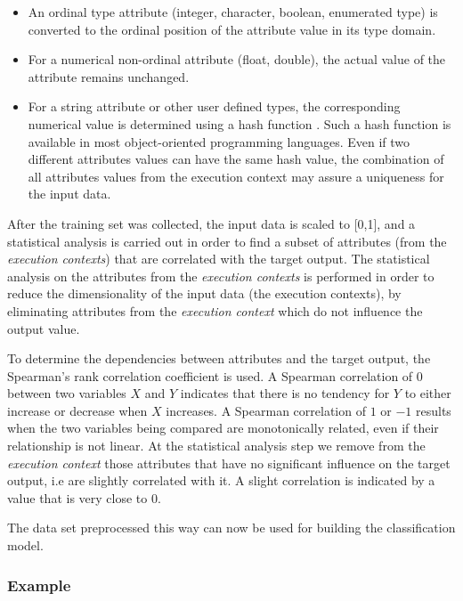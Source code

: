 \begin{itemize}

\item An ordinal type attribute (integer, character, boolean, enumerated type) is converted to the ordinal position of the attribute value in its type domain.

\item For a numerical non-ordinal attribute (float, double), the actual value of the attribute remains unchanged.

\item For a string attribute or other user defined types, the corresponding numerical value is determined using a hash function \cite{Cormen09Introduction}. Such a hash function is available in most object-oriented programming languages. Even if two different attributes values can have the same hash value, the combination of all attributes values from the execution context may assure a uniqueness for the input data.

\end{itemize}

After the training set was collected, the input data is scaled to [0,1], and a statistical analysis is carried out in order to find a subset of attributes (from the \emph{execution contexts}) that are correlated with the target output.  The statistical analysis on the attributes from the \emph{execution contexts} is performed in order to reduce the dimensionality of the input data (the execution contexts), by eliminating attributes from the \emph{execution context} which do not influence the output value.

To determine the dependencies between attributes and the target output, the Spearman's rank correlation coefficient \cite{spearman} is used. A Spearman correlation of $0$ between two variables $X$ and $Y$ indicates that there is no tendency for $Y$ to either increase or decrease when $X$ increases. A Spearman correlation of $1$ or $-1$ results when the two variables being compared are monotonically related, even if their relationship is not linear.  At the statistical analysis step we remove from the \emph{execution context} those attributes that have no significant influence on the target output, i.e are slightly correlated with it. A slight correlation is indicated by a value that is very close to $0$.

The data set preprocessed this way can now be used for building the classification model.

\subsubsection*{Example}

